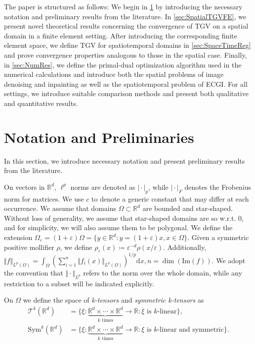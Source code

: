 \documentclass{article}
\newcommand{\dx}{\mathrm{d}}
\newcommand{\R}{\mathbb{R}}
\newcommand{\TGV}{\mathrm{TGV}}
\begin{document}
	The paper is structured as follows:
	We begin in \cref{sec:NotationPrelim} by introducing the necessary notation and preliminary results from the literature.
	In \cref{sec:SpatialTGVFE}, we present novel theoretical results concerning the convergence of $\TGV$ on a spatial domain in a finite element setting.
	After introducing the corresponding finite element space, we define $\TGV$ for spatiotemporal domains in \cref{sec:SpaceTimeReg} and prove convergence properties analogous to those in the spatial case.
	Finally, in \cref{sec:NumRes}, we define the primal-dual optimization algorithm used in the numerical calculations and introduce both the spatial problems of image denoising and inpainting as well as the spatiotemporal problem of ECGI.
	For all settings, we introduce suitable comparison methods and present both qualitative and quantitative results. 

	\section{Notation and Preliminaries}
	\label{sec:NotationPrelim}
	In this section, we introduce necessary notation and present preliminary results from the literature.
	
	On vectors in $\R^d$, $\ell^p$ norms are denoted as $\vert\cdot\vert_p$, while $\vert\cdot\vert_F$ denotes the Frobenius norm for matrices.
	We use $c$ to denote a generic constant that may differ at each occurrence.
	We assume that domains $\Omega\subset \R^d$ are bounded and star-shaped.
	Without loss of generality, we assume that star-shaped domains are so w.r.t. 0, and for simplicity, we will also assume them to be polygonal.
	We define the extension $\Omega_\varepsilon = (1+\varepsilon) \Omega = \lbrace y\in \R^d \colon y = (1+\varepsilon)x, x\in \Omega \rbrace$.
	Given a symmetric positive mollifier $\rho$, we define $\rho_\varepsilon(x) \coloneqq \varepsilon^{-d}\rho({x}/{\varepsilon})$.
	Additionally, $\Vert f\Vert_{L^p(\Omega)} = \int_\Omega \left({\sum_{i=1}^{n}\Vert f_i(x)\Vert_{L^p(\Omega)}}\right)^{1/p}\dx x, n=\dim(\mathrm{Im}(f))$.
	We adopt the convention that $\Vert\cdot\Vert_{L^p}$ refers to the norm over the whole domain, while any restriction to a subset will be indicated explicitly.
	
	On $\Omega$ we define the space of \emph{k-tensors} and \emph{symmetric k-tensors} as
	\begin{align*}
		\mathcal{T}^k(\mathbb{R}^d)
		&= \{ \xi : \underbrace{\mathbb{R}^d \times \cdots \times \mathbb{R}^d}_{k\text{ times}} \to \mathbb{R}
		\colon \xi \text{ is $k$-linear} \}, \\
		\mathrm{Sym}^k(\mathbb{R}^d)
		&= \{ \xi : \underbrace{\mathbb{R}^d \times \cdots \times \mathbb{R}^d}_{k\text{ times}} \to \mathbb{R}
		\colon \xi \text{ is $k$-linear and symmetric}\}.
	\end{align*}
	
\end{document}
